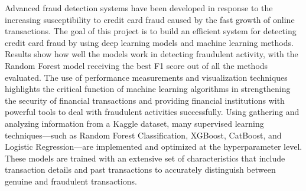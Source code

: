 Advanced fraud detection systems have been developed in response to the increasing susceptibility to credit card fraud caused by the fast growth of online transactions. The goal of this project is to build an efficient system for detecting credit card fraud by using deep learning models and machine learning methods. Results show how well the models work in detecting fraudulent activity, with the Random Forest model receiving the best F1 score out of all the methods evaluated. The use of performance measurements and visualization techniques highlights the critical function of machine learning algorithms in strengthening the security of financial transactions and providing financial institutions with powerful tools to deal with fraudulent activities successfully. Using gathering and analyzing information from a Kaggle dataset, many supervised learning techniques—such as Random Forest Classification, XGBoost, CatBoost, and Logistic Regression—are implemented and optimized at the hyperparameter level. These models are trained with an extensive set of characteristics that include transaction details and past transactions to accurately distinguish between genuine and fraudulent transactions.

 






